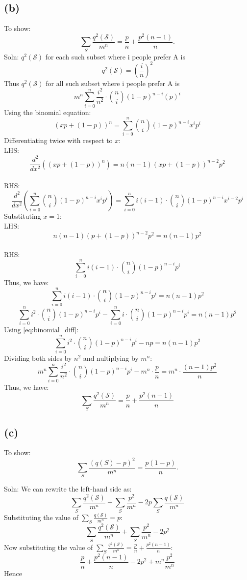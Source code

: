 \documentclass{report}
\begin{document}
\subsection*{(b)}
To show:
\[
    \sum_{S} \frac{q^{2}(\mathcal{S})}{m^{n}} = \frac{p}{n} + \frac{p^{2}(n-1)}{n}.
\]
Soln:
    \(q^2(\mathcal{S})\) for each such subset where i people prefer A is 
    \[q^2(\mathcal{S}) = (\frac{i}{n})^2\]
    Thus \(q^2(\mathcal{S})\) for all such subset where i people prefer A is
    \[m^n \sum_{i=0}^{n} \frac{i^2}{n^2} \cdot \binom{n}{i}(1-p)^{n - i} (p)^i\]
    Using the binomial equation:
    \[(xp + (1-p))^n = \sum_{i=0}^{n}\binom{n}{i}(1-p)^{n-i}x^i p^i\]
    Differentiating twice with respect to \(x\):
    \\LHS:
    \[\frac{d^2}{dx^2}((xp + (1-p))^n) = n(n-1)(xp + (1-p))^{n-2}p^2 \]
    \\RHS: 
    \[\frac{d^2}{dx^2}(\sum_{i=0}^{n}\binom{n}{i}(1-p)^{n-i}x^i p^i) = \sum_{i=0}^{n} i(i-1) \cdot \binom{n}{i}(1-p)^{n-i}x^{i-2}p^i\]
    Substituting \(x = 1\):
    \\LHS:
    \[n(n-1)(p + (1-p))^{n-2}p^2 = n(n-1)p^2\]
    \\RHS:  
    \[\sum_{i=0}^{n} i(i-1) \cdot \binom{n}{i}(1-p)^{n-i}p^i\]
    Thus, we have:
    \[\sum_{i=0}^{n} i(i-1) \cdot \binom{n}{i}(1-p)^{n-i}p^i = n(n-1)p^2\]
    \[\sum_{i=0}^{n} i^2 \cdot \binom{n}{i}(1-p)^{n-i}p^i - \sum_{i=0}^{n} i \cdot \binom{n}{i}(1-p)^{n-i}p^i = n(n-1)p^2\]
    Using {\ref{eq:binomial_diff}}:
    \[\sum_{i=0}^{n} i^2 \cdot \binom{n}{i}(1-p)^{n-i}p^i -np = n(n-1)p^2\]
    Dividing both sides by \(n^2\) and nultiplying by \(m^n\):
    \[m^n \sum_{i=0}^{n} \frac{i^2}{n^2} \cdot \binom{n}{i}(1-p)^{n-i}p^i - m^n \cdot \frac{p}{n} = m^n \cdot \frac{(n-1)p^2}{n}\]
    Thus, we have:
    \[\sum_{S} \frac{q^{2}(\mathcal{S})}{m^{n}} = \frac{p}{n} + \frac{p^{2}(n-1)}{n}\]

\subsection*{(c)}
To show:
\[
    \sum_{S} \frac{\left(q(S) - p\right)^{2}}{m^{n}} = \frac{p(1-p)}{n}.
\]

Soln:
We can rewrite the left-hand side as:
\[\sum_{S} \frac{q^2(\mathcal{S})}{m^{n}} + \sum_{S} \frac{p^{  2}}{m^{n}} - 2p\sum_{S} \frac{q(\mathcal{S})}{m^{n}}\]
Substituting the value of \(\sum_{S} \frac{q(\mathcal{S})}{m^{n}} = p\):
\[\sum_{S} \frac{q^2(\mathcal{S})}{m^{n}} + \sum_{S} \frac{p^{  2}}{m^{n}} - 2p^{2}\]
Now substituting the value of \(\sum_{S} \frac{q^2(\mathcal{S})}{m^{n}} = \frac{p}{n} + \frac{p^{2}(n-1)}{n}\):
\[\frac{p}{n} + \frac{p^{2}(n-1)}{n} - 2p^{2} + m^{n}\frac{p^{  2}}{m^{n}}\]
Hence
\end{document}
